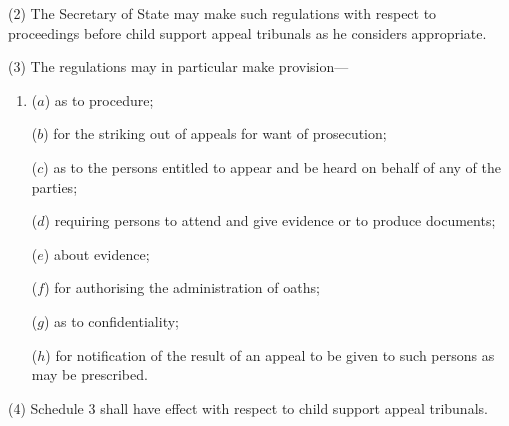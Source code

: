 \documentclass[12pt,a4paper]{article}
\begin{document}
(2) The Secretary of State may make such regulations with respect to proceedings before child support appeal tribunals as he considers appropriate.

(3) The regulations may in particular make provision—
\begin{enumerate}\item[]
($a$) as to procedure;

($b$) for the striking out of appeals for want of prosecution;

($c$) as to the persons entitled to appear and be heard on behalf of any of the parties;

($d$) requiring persons to attend and give evidence or to produce documents;

($e$) about evidence;

($f$) for authorising the administration of oaths;

($g$) as to confidentiality;

($h$) for notification of the result of an appeal to be given to such persons as may be prescribed.
\end{enumerate}

(4) Schedule 3 shall have effect with respect to child support appeal tribunals.

\end{document}
